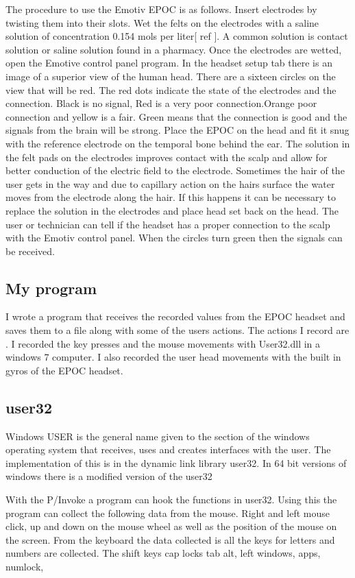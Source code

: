 The procedure to use the Emotiv EPOC is as follows.
Insert electrodes by twisting them into their slots.
Wet the felts on the electrodes with a saline solution of concentration 0.154 mols per liter[ ref ]. A common solution is contact solution or saline solution found in a pharmacy. Once the electrodes are wetted, open the Emotive control panel program. In the headset setup tab there is an image of a superior view of the human head. There are a sixteen circles on the view that will be red.
The red dots indicate the state of the electrodes and the connection. Black is no signal, Red is a very poor connection.Orange poor connection and yellow is a fair. Green means that the connection is good and the signals from the brain will be strong.
Place the EPOC on the head and fit it snug with the reference electrode on the temporal bone behind the ear.
The solution in the felt pads on the electrodes improves contact with the scalp and allow for better conduction of the electric field to the electrode. Sometimes the hair of the user gets in the way and due to capillary action on the hairs surface the water moves from the electrode along the hair. If this happens it can be necessary to replace the solution in the electrodes and place head set back on the head. The user or technician can tell if the headset has a proper connection to the scalp with the Emotiv control panel. When the circles turn green then the signals can be received.


\subsection{My program }
I wrote a program that receives the recorded values from the EPOC headset and saves them to a file along with some of the users actions. The actions I record are . I recorded the key presses and the mouse movements with User32.dll in a windows 7 computer. I also recorded the user head movements with the built in gyros of the EPOC headset. 

\subsection{user32}
Windows USER  is the general name given to the section of the windows operating system that receives, uses and creates interfaces with the user. The implementation of this is in the dynamic link library user32. In 64 bit versions of windows there is a modified version of the user32 

With the P/Invoke a program can hook the functions in user32. Using this the program can collect the following data from the mouse. Right and left mouse click, up and down on the mouse wheel as well as the position of the mouse on the screen.
From the keyboard the data collected is all the keys for letters and numbers are collected. The shift keys cap locks tab alt, left windows, apps, numlock, 

